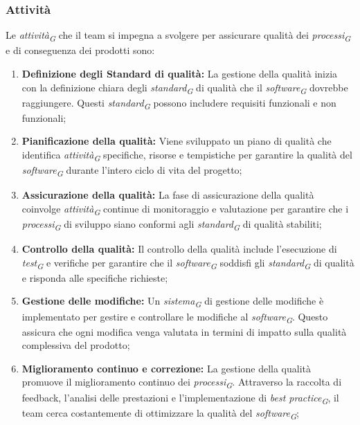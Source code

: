 \subsubsection{Attività}
Le \textit{attività}\textsubscript{\textit{G}} che il team si impegna a svolgere per assicurare qualità dei \textit{processi}\textsubscript{\textit{G}} e di conseguenza dei prodotti sono:
\begin{enumerate}
    \item \textbf{Definizione degli Standard di qualità:}
        La gestione della qualità inizia con la definizione chiara degli \textit{standard}\textsubscript{\textit{G}} di qualità che il \textit{software}\textsubscript{\textit{G}} dovrebbe raggiungere. Questi \textit{standard}\textsubscript{\textit{G}} possono includere requisiti funzionali e non funzionali;

    \item \textbf{Pianificazione della qualità:}
        Viene sviluppato un piano di qualità che identifica \textit{attività}\textsubscript{\textit{G}} specifiche, risorse e tempistiche per garantire la qualità del \textit{software}\textsubscript{\textit{G}} durante l'intero ciclo di vita del progetto;

    \item \textbf{Assicurazione della qualità:}
        La fase di assicurazione della qualità coinvolge \textit{attività}\textsubscript{\textit{G}} continue di monitoraggio e valutazione per garantire che i \textit{processi}\textsubscript{\textit{G}} di sviluppo siano conformi agli \textit{standard}\textsubscript{\textit{G}} di qualità stabiliti;

    \item \textbf{Controllo della qualità:}
        Il controllo della qualità include l'esecuzione di \textit{test}\textsubscript{\textit{G}} e verifiche per garantire che il \textit{software}\textsubscript{\textit{G}} soddisfi gli \textit{standard}\textsubscript{\textit{G}} di qualità e risponda alle specifiche richieste;

    \item \textbf{Gestione delle modifiche:}
        Un \textit{sistema}\textsubscript{\textit{G}} di gestione delle modifiche è implementato per gestire e controllare le modifiche al \textit{software}\textsubscript{\textit{G}}. Questo assicura che ogni modifica venga valutata in termini di impatto sulla qualità complessiva del prodotto;

    \item \textbf{Miglioramento continuo e correzione:}
        La gestione della qualità promuove il miglioramento continuo dei \textit{processi}\textsubscript{\textit{G}}. Attraverso la raccolta di feedback, l'analisi delle prestazioni e l'implementazione di \textit{best practice}\textsubscript{\textit{G}}, il team cerca costantemente di ottimizzare la qualità del \textit{software}\textsubscript{\textit{G}};


\end{enumerate}

